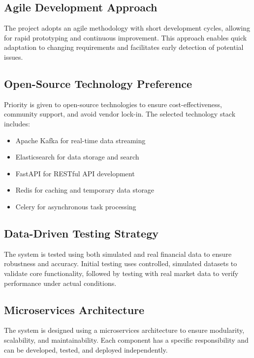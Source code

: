 \subsection{Agile Development Approach}

The project adopts an agile methodology with short development cycles, allowing for rapid prototyping and continuous improvement. This approach enables quick adaptation to changing requirements and facilitates early detection of potential issues.

\subsection{Open-Source Technology Preference}

Priority is given to open-source technologies to ensure cost-effectiveness, community support, and avoid vendor lock-in. The selected technology stack includes:
\begin{itemize}
    \item Apache Kafka for real-time data streaming
    \item Elasticsearch for data storage and search
    \item FastAPI for RESTful API development
    \item Redis for caching and temporary data storage
    \item Celery for asynchronous task processing
\end{itemize}

\subsection{Data-Driven Testing Strategy}

The system is tested using both simulated and real financial data to ensure robustness and accuracy. Initial testing uses controlled, simulated datasets to validate core functionality, followed by testing with real market data to verify performance under actual conditions.

\subsection{Microservices Architecture}

The system is designed using a microservices architecture to ensure modularity, scalability, and maintainability. Each component has a specific responsibility and can be developed, tested, and deployed independently.

